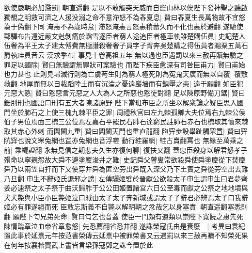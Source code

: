 欲使嚴朝必加濫罰|{
	朝直遥翻}
是以不敢觸突天威而自竄山林以俟陛下發神聖之聽啟獨覩之明救可濟之人援没溺之命不意滯怒不為春夏息|{
	賢曰春夏生長萬物故不宜怒為于偽翻下同}
淹恚不為歲時怠|{
	滯怒淹恚言怒恚積蓄久而不化也恚於避翻}
遂馳使郵驛布告遠近嚴文尅剝痛於霜雪逐臣者窮人途追臣者極車軌雖楚購伍員|{
	史記楚人伍奢為平王太子建太傅費無極譖殺奢奢子員字子胥奔吳楚購之得伍員者賜粟五萬石爵執珪員音云}
漢求季布|{
	事見十卷高祖五年}
無以過也臣遇罰以來三赦再贖無驗之罪足以蠲除|{
	賢曰無驗謂無罪狀可案驗也}
而陛下疾臣愈深有司咎臣甫力|{
	賢曰甫始也力甚也}
止則見埽滅行則為亡虜苟生則為窮人極死則為寃鬼天廣而無以自覆|{
	覆敷救翻}
地厚而無以自載蹈陸土而有沉淪之憂遠巖墻而有鎮壓之患|{
	遠于願翻}
如臣犯元惡大憝|{
	賢曰憝惡言元惡之人大為人之所惡也憝徒對翻}
足以陳原野備刀鋸|{
	賢曰鋸刖刑也國語曰刑有五大者陳諸原野}
陛下當班布臣之所坐以解衆論之疑臣思入國門坐於肺石之上使三槐九棘平臣之罪|{
	周禮秋官曰左九棘孤卿大夫位焉右九棘公侯伯子男位焉面三槐三公位焉左嘉石平罷民右肺石達窮民註肺石赤石也槐取其懷來棘取其赤心外刺}
而閶闔九重|{
	賢曰閶闔天門也重直龍翻}
陷穽步設舉趾觸罘罝|{
	賢曰穽阬穽也說文罘兔網也罝亦兔網也音浮嗟}
動行絓羅網|{
	絓古賣翻罥也}
無緣至萬乘之前|{
	乘繩證翻}
永無見信之期悲夫久生亦復何聊|{
	復扶又翻}
蓋忠臣殺身以解君怒孝子殞命以寧親怨故大舜不避塗廩浚井之難|{
	史記舜父瞽叟常欲殺舜使舜塗廩從下焚廩舜乃以兩笠自扞而下又使穿井舜為匿空旁出舜既入深父乃下土實之舜從旁空出去難乃旦翻}
申生不辭姬氏讒邪之謗|{
	左傳驪姬嬖於晉獻公欲殺太子申生謂申生曰君夢齊姜必速祭之太子祭于曲沃歸胙于公公田姬置諸宫六日公至毒而獻之公祭之地地墳與犬犬斃與小臣小臣斃姬泣曰賊由太子太子奔新城或謂太子子辭君必辨焉太子曰我辭姬必有罪遂縊而死}
臣敢忘斯義不自斃以解明朝之忿哉乞以身塞責|{
	朝直遥翻塞悉則翻}
願陛下匄兄弟死命|{
	賢曰匄乞也音蓋}
使臣一門頗有遺類以崇陛下寛饒之惠先死陳情臨章泣血帝省章愈怒|{
	先悉薦翻省悉井翻}
遂誅榮寇氏由是衰廢　|{
	考異曰袁紀置此事於延熹元年按范書榮傳云延熹中被罪榮書又云遇罰以來三赦再贖不知榮死果在何年按襄楷竇武上書皆言梁孫寇鄧之誅今置於此}


